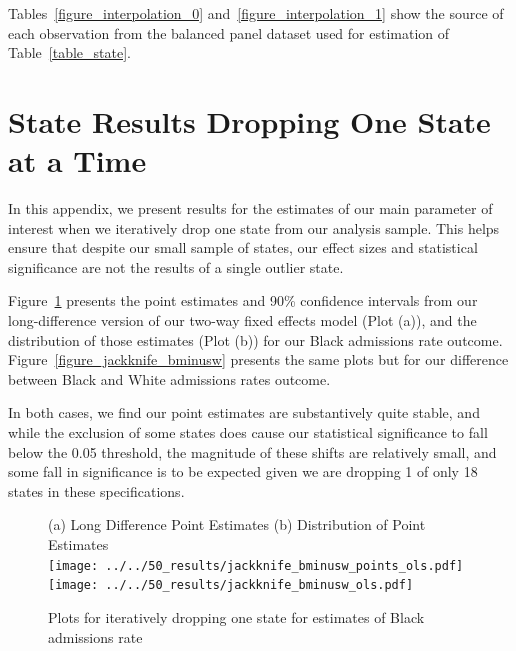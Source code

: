 \documentclass[12pt]{article}
\begin{document}
 Tables~\ref{figure_interpolation_0} and~\ref{figure_interpolation_1} show the source of each observation from the balanced panel dataset used for estimation of Table~\ref{table_state}.

 
 




\clearpage \newpage
\section{State Results Dropping One State at a Time}\label{appendix_jackknife}
\setcounter{table}{0}
\setcounter{figure}{0}
\renewcommand{\thetable}{F\arabic{table}}
\renewcommand{\thefigure}{F\arabic{figure}}
\normalsize

In this appendix, we present results for the estimates of our main parameter of interest when we iteratively drop one state from our analysis sample.  This helps ensure that despite our small sample of states, our effect sizes and statistical significance are not the results of a single outlier state.

Figure~\ref{figure_jackknife_black} presents the point estimates and 90\% confidence intervals from our long-difference version of our two-way fixed effects model (Plot (a)), and the distribution of those estimates (Plot (b)) for our Black admissions rate outcome. Figure~\ref{figure_jackknife_bminusw} presents the same plots but for our difference between Black and White admissions rates outcome.

In both cases, we find our point estimates are substantively quite stable, and while the exclusion of some states does cause our statistical significance to fall below the 0.05 threshold, the magnitude of these shifts are relatively small, and some fall in significance is to be expected given we are dropping 1 of only 18 states in these specifications.

\begin{figure}[h!]
 	\begin{center}
 	\caption{ Plots for iteratively dropping one state for estimates of Black admissions rate }
 	\small
		(a) Long Difference Point Estimates \hspace*{.4in} (b) Distribution of Point Estimates \\
 			\texttt{[image: ../../50\_results/jackknife\_bminusw\_points\_ols.pdf]}
 			\texttt{[image: ../../50\_results/jackknife\_bminusw\_ols.pdf]} \\
       \smallskip
       \label{figure_jackknife_black}
       \end{center}
\end{figure} \normalsize
\end{document}
